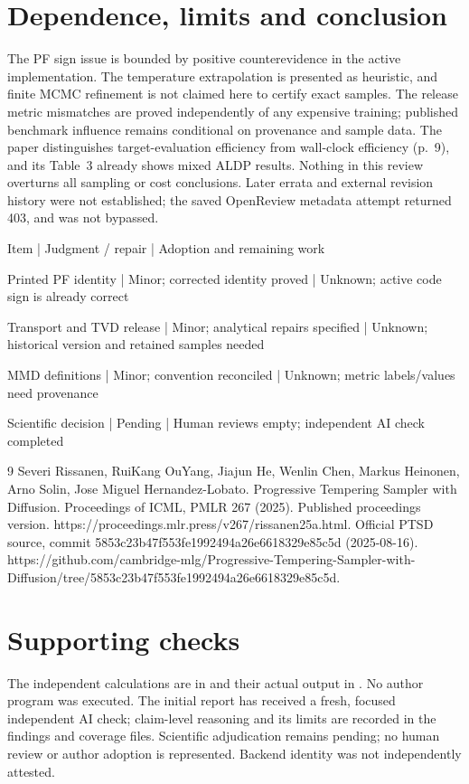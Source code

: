 \documentclass[10pt]{article}
\begin{document}
\section*{Dependence, limits and conclusion}
The PF sign issue is bounded by positive counterevidence in the active implementation. The temperature extrapolation is presented as heuristic, and finite MCMC refinement is not claimed here to certify exact samples. The release metric mismatches are proved independently of any expensive training; published benchmark influence remains conditional on provenance and sample data. The paper distinguishes target-evaluation efficiency from wall-clock efficiency (p. 9), and its Table 3 already shows mixed ALDP results. Nothing in this review overturns all sampling or cost conclusions. Later errata and external revision history were not established; the saved OpenReview metadata attempt returned 403, and was not bypassed.\par
Item | Judgment / repair | Adoption and remaining work\par
Printed PF identity | Minor; corrected identity proved | Unknown; active code sign is already correct\par
Transport and TVD release | Minor; analytical repairs specified | Unknown; historical version and retained samples needed\par
MMD definitions | Minor; convention reconciled | Unknown; metric labels/values need provenance\par
Scientific decision | Pending | Human reviews empty; independent AI check completed\par
9 Severi Rissanen, RuiKang OuYang, Jiajun He, Wenlin Chen, Markus Heinonen, Arno Solin, Jose Miguel Hernandez-Lobato. Progressive Tempering Sampler with Diffusion. Proceedings of ICML, PMLR 267 (2025). Published proceedings version. https://proceedings.mlr.press/v267/rissanen25a.html. Official PTSD source, commit 5853c23b47f553fe1992494a26e6618329e85c5d (2025-08-16). https://github.com/cambridge-mlg/Progressive-Tempering-Sampler-with-Diffusion/tree/5853c23b47f553fe1992494a26e6618329e85c5d.\par
\section*{Supporting checks}
The independent calculations are in and their actual output in . No author program was executed. The initial report has received a fresh, focused independent AI check; claim-level reasoning and its limits are recorded in the findings and coverage files. Scientific adjudication remains pending; no human review or author adoption is represented. Backend identity was not independently attested.\par
\end{document}
